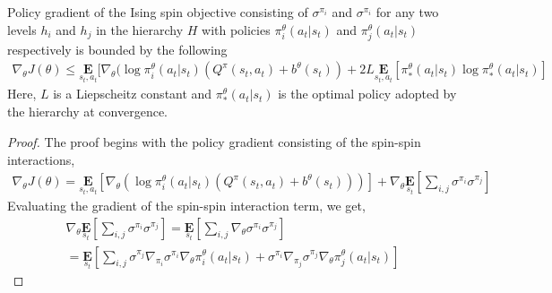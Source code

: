 \documentclass{article}
\begin{document}
\begin{prop}{4}\label{four}
    Policy gradient of the Ising spin objective consisting of $\sigma^{\pi_{i}}$  and $\sigma^{\pi_{i}}$ for any two levels $h_{i}$ and $h_{j}$ in the hierarchy $H$ with policies $\pi^{\theta}_{i}(a_{t}|s_{t})$ and $\pi^{\theta}_{j}(a_{t}|s_{t})$ respectively is bounded by the following 
    \begin{gather}
        \nabla_{\theta}J(\theta) \leq \underset{s_{t},a_{t}}{\textbf{E}}[\nabla_{\theta}(\log \pi^{\theta}_{i}(a_{t}|s_{t})(Q^{\pi}(s_{t},a_{t}) + b^{\theta}(s_{t})) + 2L\underset{s_{t},a_{t}}{\textbf{E}}[\pi^{\theta}_{*}(a_{t}|s_{t})\log \pi^{\theta}_{*}(a_{t}|s_{t})] \nonumber
    \end{gather}
    Here, $L$ is a Liepscheitz constant and $\pi^{\theta}_{*}(a_{t}|s_{t})$ is the optimal policy adopted by the hierarchy at convergence.
\end{prop}
\begin{proof}
    The proof begins with the policy gradient consisting of the spin-spin interactions,
    \begin{gather}
        \nabla_{\theta}J(\theta) = \underset{s_{t},a_{t}}{\textbf{E}}[\nabla_{\theta}(\log \pi^{\theta}_{i}(a_{t}|s_{t})(Q^{\pi}(s_{t},a_{t}) + b^{\theta}(s_{t})))] + \nabla_{\theta}\underset{s_{t}}{\textbf{E}}[\sum_{i,j} \sigma^{\pi_{i}}\sigma^{\pi_{j}}] \nonumber
    \end{gather}
    Evaluating the gradient of the spin-spin interaction term, we get,
    \begin{gather}
        \nabla_{\theta} \underset{s_{t}}{\textbf{E}}[\sum_{i,j} \sigma^{\pi_{i}}\sigma^{\pi_{j}}] = \underset{s_{t}}{\textbf{E}}[\sum_{i,j} \nabla_{\theta}\sigma^{\pi_{i}}\sigma^{\pi_{j}}] \nonumber \\
        = \underset{s_{t}}{\textbf{E}}[\sum_{i,j} \sigma^{\pi_{j}} \nabla_{\pi_{i}}\sigma^{\pi_{i}}\nabla_{\theta}\pi^{\theta}_{i}(a_{t}|s_{t}) + \sigma^{\pi_{i}} \nabla_{\pi_{j}}\sigma^{\pi_{j}}\nabla_{\theta}\pi^{\theta}_{j}(a_{t}|s_{t})] \nonumber
    \end{gather}

\end{proof}


 

\end{document}
